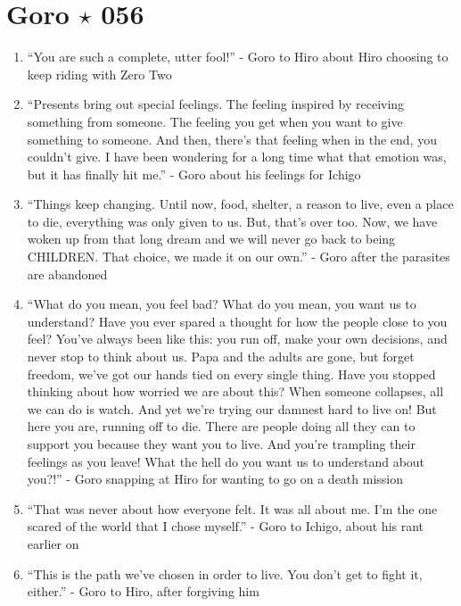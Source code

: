 \documentclass{book}
\numberwithin{equation}{section}
\begin{document}
\section{Goro $\star$ 056}
\begin{enumerate}
    \item ``You are such a complete, utter fool!'' - Goro to Hiro about Hiro choosing to keep riding with Zero Two
    \item ``Presents bring out special feelings. The feeling inspired by receiving something from someone. The feeling you get when you want to give something to someone. And then, there's that feeling when in the end, you couldn't give. I have been wondering for a long time what that emotion was, but it has finally hit me.'' - Goro about his feelings for Ichigo
    \item ``Things keep changing. Until now, food, shelter, a reason to live, even a place to die, everything was only given to us. But, that's over too. Now, we have woken up from that long dream and we will never go back to being CHILDREN. That choice, we made it on our own.'' - Goro after the parasites are abandoned
    \item ``What do you mean, you feel bad? What do you mean, you want us to understand? Have you ever spared a thought for how the people close to you feel? You've always been like this: you run off, make your own decisions, and never stop to think about us. Papa and the adults are gone, but forget freedom, we've got our hands tied on every single thing. Have you stopped thinking about how worried we are about this? When someone collapses, all we can do is watch. And yet we're trying our damnest hard to live on! But here you are, running off to die. There are people doing all they can to support you because they want you to live. And you're trampling their feelings as you leave! What the hell do you want us to understand about you?!'' - Goro snapping at Hiro for wanting to go on a death mission
    \item ``That was never about how everyone felt. It was all about me. I'm the one scared of the world that I chose myself.'' - Goro to Ichigo, about his rant earlier on
    \item ``This is the path we've chosen in order to live. You don't get to fight it, either.'' - Goro to Hiro, after forgiving him
\end{enumerate}
\end{document}
